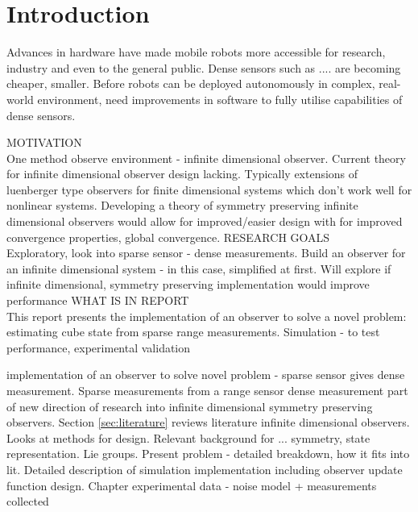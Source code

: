 \chapter{Introduction}

Advances in hardware have made mobile robots more accessible for research, industry and even to the general public. Dense sensors such as .... are becoming cheaper, smaller. Before robots can be deployed autonomously in complex, real-world environment, need improvements in software to fully utilise capabilities of dense sensors.

MOTIVATION\\
	One method observe environment - infinite dimensional observer. 
	Current theory for infinite dimensional observer design lacking. Typically extensions of luenberger type observers for finite dimensional systems which don't work well for nonlinear systems.
	Developing a theory of symmetry preserving infinite dimensional observers would allow for improved/easier design with for improved convergence properties, global convergence. 
RESEARCH GOALS\\
	Exploratory, look into sparse sensor - dense measurements. Build an observer for an infinite dimensional system - in this case, simplified at first. Will explore if infinite dimensional, symmetry preserving implementation would improve performance
WHAT IS IN REPORT\\
	This report presents the implementation of an observer to solve a novel problem: estimating cube state from sparse range measurements.
	Simulation - to test performance, experimental validation
	
	implementation of an observer to solve novel problem - sparse sensor gives dense measurement.
	Sparse measurements from a range sensor
	dense measurement part of new direction of research into infinite dimensional symmetry preserving observers.
	Section \ref{sec:literature} reviews literature infinite dimensional observers. Looks at methods for design.
	Relevant background for ... symmetry, state representation. Lie groups. 
	Present problem - detailed breakdown, how it fits into lit. 
	Detailed description of simulation implementation including observer update function design.
	Chapter 
	experimental data - noise model + measurements collected


